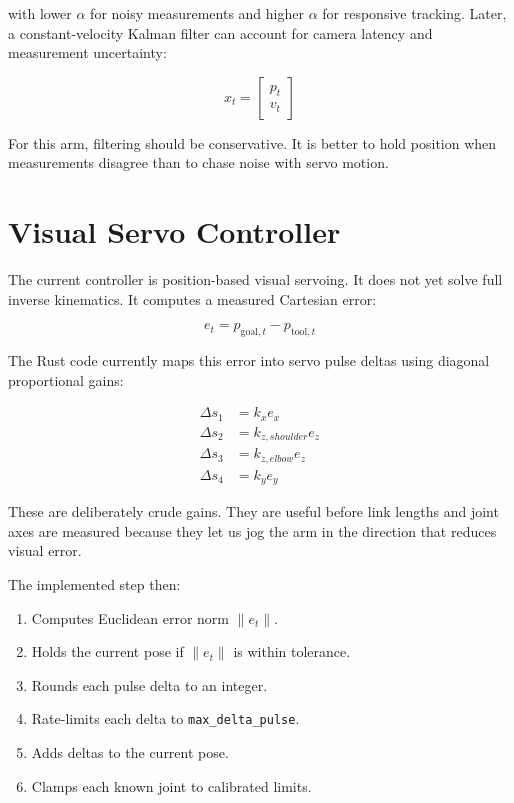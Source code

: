 \documentclass[11pt]{article}
\begin{document}
with lower $\alpha$ for noisy measurements and higher $\alpha$ for responsive
tracking. Later, a constant-velocity Kalman filter can account for camera
latency and measurement uncertainty:

\[
    x_t =
    \begin{bmatrix}
    p_t \\ v_t
    \end{bmatrix}
\]

For this arm, filtering should be conservative. It is better to hold position
when measurements disagree than to chase noise with servo motion.

\section{Visual Servo Controller}

The current controller is position-based visual servoing. It does not yet solve
full inverse kinematics. It computes a measured Cartesian error:

\[
    e_t = p_{\text{goal},t} - p_{\text{tool},t}
\]

The Rust code currently maps this error into servo pulse deltas using diagonal
proportional gains:

\[
\begin{aligned}
    \Delta s_1 &= k_x e_x \\
    \Delta s_2 &= k_{z,shoulder} e_z \\
    \Delta s_3 &= k_{z,elbow} e_z \\
    \Delta s_4 &= k_y e_y
\end{aligned}
\]

These are deliberately crude gains. They are useful before link lengths and
joint axes are measured because they let us jog the arm in the direction that
reduces visual error.

The implemented step then:

\begin{enumerate}[leftmargin=*]
    \item Computes Euclidean error norm $\|e_t\|$.
    \item Holds the current pose if $\|e_t\|$ is within tolerance.
    \item Rounds each pulse delta to an integer.
    \item Rate-limits each delta to \texttt{max\_delta\_pulse}.
    \item Adds deltas to the current pose.
    \item Clamps each known joint to calibrated limits.
\end{enumerate}
\end{document}
